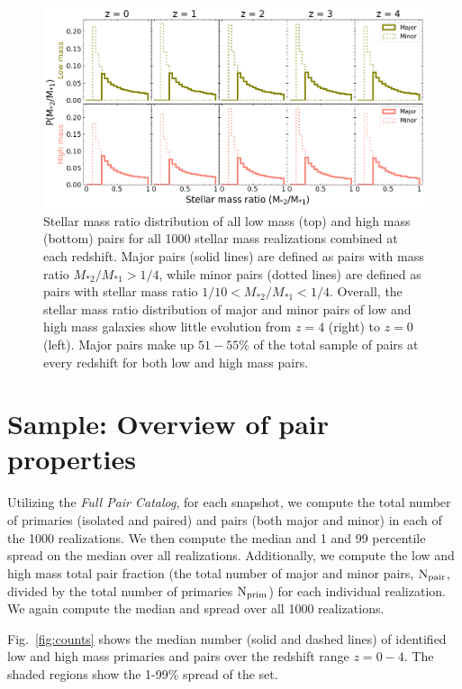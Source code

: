 \documentclass[twocolumn]{aastex631}
\newcommand{\ms}[1]{\ensuremath{M_{*{#1}}}}
\newcommand{\paircat}{\textit{Full Pair Catalog}}
\begin{document}
\begin{figure}[htb]
    \centering
    \includegraphics[width=\textwidth]{smrdist_1000.png}
    \caption{Stellar mass ratio distribution of all low mass (top) and high mass (bottom) pairs for all 1000 stellar mass realizations combined at each redshift. Major pairs (solid lines) are defined as pairs with mass ratio $\ms{2}/\ms{1} > 1/4$, while minor pairs (dotted lines) are defined as pairs with stellar mass ratio $1/10<\ms{2}/\ms{1}<1/4$. Overall, the stellar mass ratio distribution of major and minor pairs of low and high mass galaxies show little evolution from $z=4$ (right) to $z=0$ (left). 
    Major pairs make up $51-55\%$ of the total sample of pairs at every redshift for both low and high mass pairs.}
    \label{fig:massratio}
\end{figure}

\section{Sample: Overview of pair properties} \label{sec:pairprops}
    Utilizing the \paircat, for each snapshot, we compute the total number of primaries (isolated and paired) and pairs (both major and minor) in each of the 1000 realizations. We then compute the median and 1 and 99 percentile spread on the median over all realizations. 
    Additionally, we compute the low and high mass total pair fraction (the total number of major and minor pairs, $\rm N_{pair}$, divided by the total number of primaries $\rm N_{prim}$) for each individual realization. We again compute the median and spread over all 1000 realizations. 
    
    Fig.~\ref{fig:counts} shows the median number (solid and dashed lines) of identified low and high mass primaries and pairs over the redshift range $z=0-4$.   
    The shaded regions show the 1-99\% spread of the set. 
\end{document}
